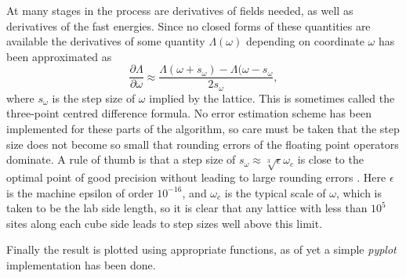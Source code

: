 \documentclass[main.tex]{subfiles}
\begin{document}
At many stages in the process are derivatives of fields needed, as well as derivatives of
the fast energies. Since no closed forms of these quantities are available the derivatives
of some quantity \(\Lambda (\omega)\) depending on coordinate \(\omega\) has been
approximated as \[
\frac{\partial \Lambda}{\partial \omega} \approx \frac{\Lambda(\omega + s_\omega) -
\Lambda(\omega - s_\omega}{2s_\omega}
,\] 
where \(s_\omega\) is the step size of \(\omega\) implied by the lattice.
This is sometimes called the three-point centred difference formula. No error estimation scheme
has been implemented for these parts of the algorithm, so care must be taken that the step size does not
become so small that rounding errors of the floating point operators dominate.
A rule of thumb is that a step size of \(s_\omega \approx \sqrt[3]{\epsilon}\omega_c\) is
close to the optimal point of good precision without leading to large rounding
errors \cite{numerical}. Here \(\epsilon\) is the machine
epsilon of order \(10^{-16}\), and \(\omega_c\) is the typical scale of \(\omega\), which
is taken to be the lab side length, so it is clear that any lattice with less than \(10^5\) sites
along each cube side leads to step sizes well above this limit.

Finally the result is plotted using appropriate functions, as of yet a simple
\textit{pyplot} implementation has been done.
\end{document}
